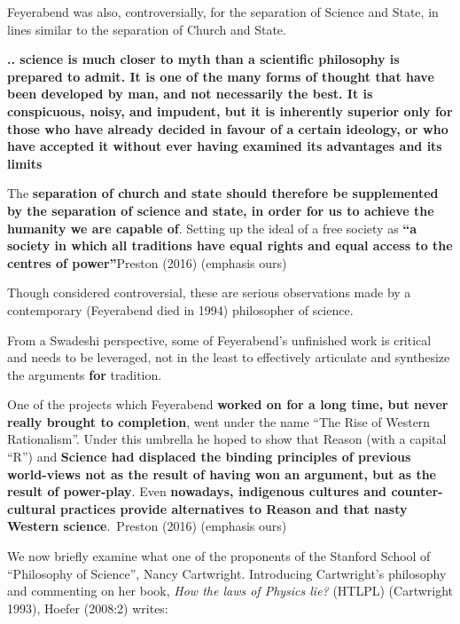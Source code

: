 Feyerabend was also, controversially, for the separation of Science and State, in lines similar to the separation of Church and State.

\begin{myquote}
\textbf{.. science is much closer to myth than a scientific philosophy is prepared to admit. It is one of the many forms of thought that have been developed by man, and not necessarily the best. It is conspicuous, noisy, and impudent, but it is inherently superior only for those who have already decided in favour of a certain ideology, or who have accepted it without ever having examined its advantages and its limits}
\end{myquote}

\begin{myquote}
The \textbf{separation of church and state should therefore be supplemented by the separation of science and state, in order for us to achieve the humanity we are capable of}. Setting up the ideal of a free society as \textbf{“a society in which all traditions have equal rights and equal access to the centres of power”}\hfill Preston (2016) (emphasis ours)
\end{myquote}

Though considered controversial, these are serious observations made by a contemporary (Feyerabend died in 1994) philosopher of science.

From a Swadeshi perspective, some of Feyerabend’s unfinished work is critical and needs to be leveraged, not in the least to effectively articulate and synthesize the arguments \textbf{for} tradition.

\begin{myquote}
One of the projects which Feyerabend \textbf{worked on for a long time, but never really brought to completion}, went under the name “The Rise of Western Rationalism”. Under this umbrella he hoped to show that Reason (with a capital “R”) and \textbf{Science had displaced the binding principles of previous world-views not as the result of having won an argument, but as the result of power-play}. Even \textbf{nowadays, indigenous cultures and counter-cultural practices provide alternatives to Reason and that nasty Western science}.~\hfill Preston (2016) (emphasis ours)
\end{myquote}

We now briefly examine what one of the proponents of the Stanford School of “Philosophy of Science”, Nancy Cartwright. Introducing Cartwright’s philosophy and commenting on her book, \textit{How the laws of Physics lie?} (HTLPL) (Cartwright 1993), Hoefer (2008:2) writes:

